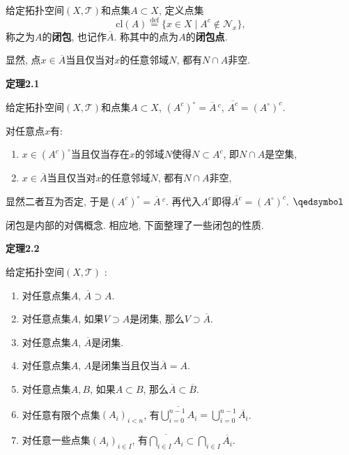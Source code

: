 给定拓扑空间$(X,\mathcal{T})$和点集$A\subset X$, 定义点集
\[
    \mathrm{cl}(A)\overset{\mathrm{def}}{=}\{x\in X\mid
    A^c\notin\mathcal{N}_x\},
\]
称之为$A$的\textbf{闭包}, 也记作$\overline{A}$. 称其中的点为$A$的\textbf{闭包点}.

显然, 点$x\in \overline{A}$当且仅当对$x$的任意邻域$N$, 都有$N\cap A$非空.

\vspace{10pt}

\hypertarget{sec:定理2.1}{}
\noindent\textbf{定理2.1}

给定拓扑空间$(X,\mathcal{T})$和点集$A\subset X$,
$(A^c)^\circ=\overline{A}\,^c$, $\overline{A^c}=(A^\circ)^c$.


对任意点$x$有:
\begin{enumerate}
    \item $x\in(A^c)^\circ$当且仅当存在$x$的邻域$N$使得$N\subset A^c$,
    即$N\cap A$是空集,
    \item $x\in\overline{A}$当且仅当对$x$的任意邻域$N$, 都有$N\cap A$非空,
\end{enumerate}
显然二者互为否定, 于是$(A^c)^\circ=\overline{A}\,^c$.
再代入$A^c$即得$\overline{A^c}=(A^\circ)^c$. \hfill $\qedsymbol$

\vspace{10pt}

闭包是内部的对偶概念. 相应地, 下面整理了一些闭包的性质.

\vspace{10pt}

\hypertarget{sec:定理2.2}{}
\noindent\textbf{定理2.2}

给定拓扑空间$(X,\mathcal{T})$ :
\begin{enumerate}
    \item 对任意点集$A$, $\overline{A}\supset A$.
    \item 对任意点集$A$, 如果$V\supset A$是闭集, 那么$V\supset\overline{A}$.
    \item 对任意点集$A$, $\overline{A}$是闭集.
    \item 对任意点集$A$, $A$是闭集当且仅当$\overline{A}=A$.
    \item 对任意点集$A,B$, 如果$A\subset B$, 那么$\overline{A}\subset\overline{B}$.
    \vspace{3pt}
    \item 对任意有限个点集$(A_i)_{i<n}$, 有$\displaystyle
    \overline{\bigcup_{i=0}^{n-1}A_i}=\bigcup_{i=0}^{n-1}\overline{A_i}$.
    \vspace{3pt}
    \item 对任意一些点集$(A_i)_{i\in I}$, 有$\displaystyle
    \overline{\bigcap_{i\in I}A_i}\subset\bigcap_{i\in I}\overline{A_i}$.
\end{enumerate}

